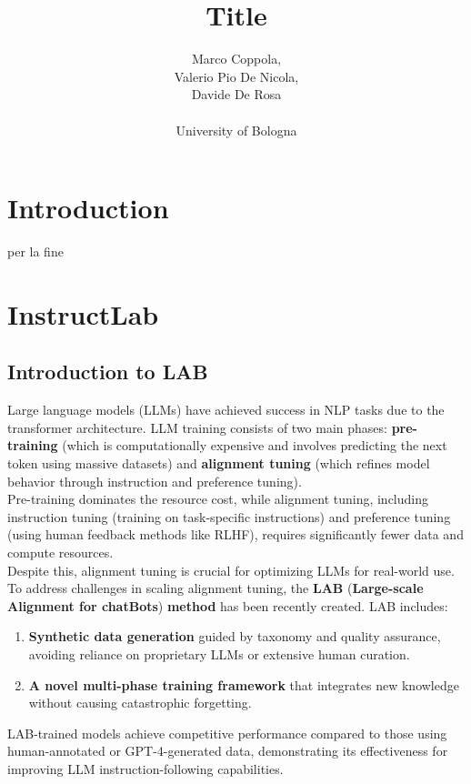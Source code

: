 \documentclass[12pt]{article}
\title{Title}
\author{Marco Coppola,\\
Valerio Pio De Nicola,\\
Davide De Rosa \\ \\
University of Bologna}
\date{}
\begin{document}
\maketitle

\section{Introduction}
per la fine

\section{InstructLab}
\subsection{Introduction to LAB}
Large language models (LLMs) have achieved success in NLP tasks due to the transformer architecture. LLM training consists of two main phases: \textbf{pre-training} (which is computationally expensive and involves predicting the next token using massive datasets) and \textbf{alignment tuning} (which refines model behavior through instruction and preference tuning).\vspace{14pt}\\
Pre-training dominates the resource cost, while alignment tuning, including instruction tuning (training on task-specific instructions) and preference tuning (using human feedback methods like RLHF), requires significantly fewer data and compute resources.\\
Despite this, alignment tuning is crucial for optimizing LLMs for real-world use.\vspace{14pt}\\
To address challenges in scaling alignment tuning, the \textbf{LAB} (\textbf{Large-scale Alignment for chatBots}\cite{sudalairaj2024lablargescalealignmentchatbots}) \textbf{method} has been recently created. LAB includes:
\begin{enumerate}
    \item \textbf{Synthetic data generation} guided by taxonomy and quality assurance, avoiding reliance on proprietary LLMs or extensive human curation.  
    \item \textbf{A novel multi-phase training framework} that integrates new knowledge without causing catastrophic forgetting.
\end{enumerate}
LAB-trained models achieve competitive performance compared to those using human-annotated or GPT-4-generated data, demonstrating its effectiveness for improving LLM instruction-following capabilities.\vspace{14pt}\\
\end{document}
